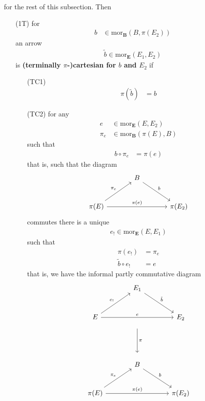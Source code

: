 for the rest of this subsection. Then
\begin{enumerate}
\item[(1T)]
for
\begin{align*}
  b
  &\in
  \mathrm{mor}_{\mathbf{B}}
  \left(
    B,
    \pi(E_{2})
  \right)
\end{align*}
an arrow
\begin{align*}
  \widetilde{b}
  \in
  \mathrm{mor}_{\mathbf{E}}(E_{1},E_{2})
\end{align*}
is \textbf{(terminally $\pi$-)cartesian for $b$ and $E_{2}$} if
\begin{enumerate}
\item[(TC1)]
\begin{align*}
  \pi(\widetilde{b})
  &=
  b
\end{align*}
\item[(TC2)]
for any
\begin{align*}
  e
  &\in
  \mathrm{mor}_{\mathbf{E}}(E,E_{2})
  \\
  \pi_{e}
  &\in
  \mathrm{mor}_{\mathbf{B}}
  \left(
    \pi(E),
    B
  \right)
\end{align*}
such that
\begin{align*}
  b
  \circ
  \pi_{e}
  &=
  \pi(e)
\end{align*}
that is, such that the diagram
\[
\begin{tikzcd}[sep=large]
  &
  B
  \arrow{dr}{b}
  &
  \\
  \pi(E)
  \arrow{ur}{\pi_{e}}
  \arrow{rr}{\pi(e)}
  &
  &
  \pi(E_{2})
\end{tikzcd}
\]
commutes there is a unique
\begin{align*}
  e_{!}
  \in
  \mathrm{mor}_{\mathbf{E}}(E,E_{1})
\end{align*}
such that
\begin{align*}
  \pi(e_{!})
  &=
  \pi_{e}
  \\
  \tilde{b}
  \circ
  e_{!}
  &=
  e
\end{align*}
that is, we have the informal partly commutative diagram
\[
\begin{tikzcd}[sep=large]
  &
  E_{1}
  \arrow{dr}{\tilde{b}}
  &
  \\
  E
  \arrow{ur}{e_{!}}
  \arrow{rr}{e}
  &
  \arrow[shorten <= 10pt, shorten >= 10pt]{dd}{\pi}
  &
  E_{2}
  \\
  &
  &
  \\
  &
  B
  \arrow{dr}{b}
  &
  \\
  \pi(E)
  \arrow{ur}{\pi_{e}}
  \arrow{rr}{\pi(e)}
  &
  &
  \pi(E_{2})

\end{tikzcd}\]
\end{enumerate}
\end{enumerate}
